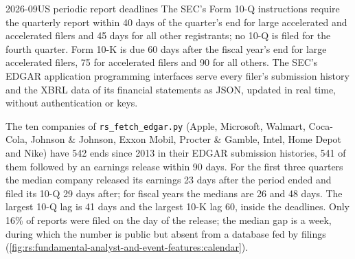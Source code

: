 \begin{omfigure}

\label{fig:rs:fundamental-analyst-and-event-features:timeline}
\end{omfigure}

\begin{dated}{2026-09}{US periodic report deadlines}\label{dat:rs:fundamental-analyst-and-event-features:deadlines}
The SEC's Form 10-Q instructions require the quarterly report within 40 days of the quarter's end for large accelerated and accelerated
filers and 45 days for all other registrants; no 10-Q is filed for the fourth quarter. Form 10-K is due 60 days after the fiscal year's end
for large accelerated filers, 75 for accelerated filers and 90 for all others. The SEC's EDGAR application programming interfaces serve
every filer's submission history and the XBRL data of its financial statements as JSON, updated in real time, without authentication or keys.
\end{dated}

The ten companies of \texttt{rs\_fetch\_edgar.py} (Apple, Microsoft, Walmart, Coca-Cola, Johnson \& Johnson, Exxon Mobil,
Procter \& Gamble, Intel, Home Depot and Nike) have 542  ends since 2013 in their EDGAR submission histories, 541 of
them followed by an earnings release within 90 days. For the first three quarters the median company released its earnings 23 days
after the period ended and filed its 10-Q 29 days after; for fiscal years the medians are 26 and 48 days. The largest 10-Q lag is
41 days and the largest 10-K lag 60, inside the deadlines. Only 16\% of reports were filed on the day of the release; the median gap is
a week, during which the number is public but absent from a database fed by filings
(\cref{fig:rs:fundamental-analyst-and-event-features:calendar}).

